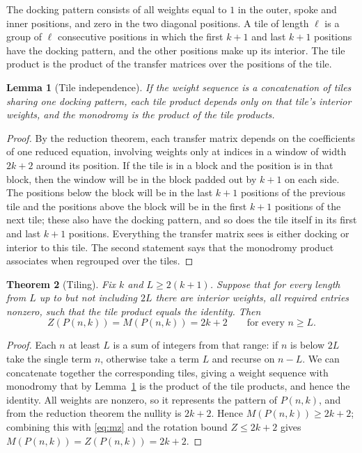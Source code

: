 \documentclass[11pt]{article}
\newtheorem{theorem}{Theorem}
\newtheorem{lemma}[theorem]{Lemma}
\theoremstyle{definition}
\begin{document}
The docking pattern consists of all weights equal to $1$ in the outer, spoke and
inner positions, and zero in the two diagonal positions. A tile of length $\ell$
is a group of $\ell$ consecutive positions in which the first $k+1$ and last
$k+1$ positions have the docking pattern, and the other positions make up its
interior. The tile product is the product of the transfer matrices over the
positions of the tile.

\begin{lemma}[Tile independence]\label{lem:tile}
If the weight sequence is a concatenation of tiles sharing one docking pattern,
each tile product depends only on that tile's interior weights, and the
monodromy is the product of the tile products.
\end{lemma}

\begin{proof}
By the reduction theorem, each transfer matrix depends on the coefficients of
one reduced equation, involving weights only at indices in a window of width
$2k+2$ around its position. If the tile is in a block and the position is in
that block, then the window will be in the block padded out by $k+1$ on each
side. The positions below the block will be in the last $k+1$ positions of the
previous tile and the positions above the block will be in the first $k+1$
positions of the next tile; these also have the docking pattern, and so does the
tile itself in its first and last $k+1$ positions. Everything the transfer
matrix sees is either docking or interior to this tile. The second statement
says that the monodromy product associates when regrouped over the tiles.
\end{proof}

\begin{theorem}[Tiling]\label{thm:tiling}
Fix $k$ and $L\ge2(k+1)$. Suppose that for every length from $L$ up to but not
including $2L$ there are interior weights, all required entries nonzero, such
that the tile product equals the identity. Then
\[
  Z(P(n,k))=M(P(n,k))=2k+2 \qquad\text{for every } n\ge L .
\]
\end{theorem}

\begin{proof}
Each $n$ at least $L$ is a sum of integers from that range: if $n$ is below $2L$
take the single term $n$, otherwise take a term $L$ and recurse on $n-L$. We can
concatenate together the corresponding tiles, giving a weight sequence with
monodromy that by Lemma~\ref{lem:tile} is the product of the tile products, and
hence the identity. All weights are nonzero, so it represents the pattern of
$P(n,k)$, and from the reduction theorem the nullity is $2k+2$.
Hence $M(P(n,k))\ge2k+2$; combining this with \eqref{eq:mz} and the rotation
bound $Z\le2k+2$ gives $M(P(n,k))=Z(P(n,k))=2k+2$.
\end{proof}
\end{document}
